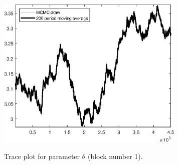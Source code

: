 \begin{figure}[H]
\centering
  \includegraphics[width=0.8\textwidth]{BRS_sectoral_wo_demand_shocks/graphs/TracePlot_theta_blck_1}\\
    \caption{Trace plot for parameter ${\theta}$ (block number 1).}
\end{figure}
